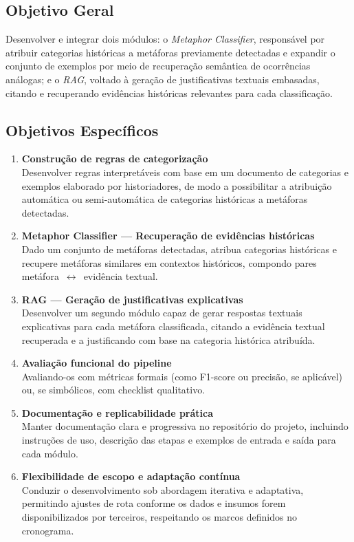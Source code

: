 \subsection{\texorpdfstring{\textbf{Objetivo
Geral}}{Objetivo Geral}}\label{objetivo-geral}

Desenvolver e integrar dois módulos: o \emph{Metaphor Classifier},
responsável por atribuir categorias históricas a metáforas previamente
detectadas e expandir o conjunto de exemplos por meio de recuperação
semântica de ocorrências análogas; e o \emph{RAG}, voltado à geração de
justificativas textuais embasadas, citando e recuperando evidências 
históricas relevantes para cada classificação.

\subsection{\texorpdfstring{\textbf{Objetivos
Específicos}}{Objetivos Específicos}}\label{objetivos-especuxedficos}

\begin{enumerate}
\def\labelenumi{\arabic{enumi}.}
\item
  \textbf{Construção de regras de categorização}\\
  Desenvolver regras interpretáveis com base em um documento de
  categorias e exemplos elaborado por historiadores, de modo a
  possibilitar a atribuição automática ou semi-automática de categorias
  históricas a metáforas detectadas.
\item
  \textbf{Metaphor Classifier --- Recuperação de evidências
  históricas}\\
  Dado um conjunto de metáforas detectadas, atribua categorias
  históricas e recupere metáforas similares em contextos históricos,
  compondo pares metáfora~$\leftrightarrow$~evidência textual.
\item
  \textbf{RAG --- Geração de justificativas explicativas}\\
  Desenvolver um segundo módulo capaz de gerar respostas textuais
  explicativas para cada metáfora classificada, citando a evidência
  textual recuperada e a justificando com base na categoria histórica
  atribuída.
\item
  \textbf{Avaliação funcional do pipeline}\\
  Avaliando-os com métricas formais (como F1-score ou precisão, se
  aplicável) ou, se simbólicos, com checklist qualitativo.
\item
  \textbf{Documentação e replicabilidade prática}\\
  Manter documentação clara e progressiva no repositório do projeto,
  incluindo instruções de uso, descrição das etapas e exemplos de
  entrada e saída para cada módulo.
\item
  \textbf{Flexibilidade de escopo e adaptação contínua}\\
  Conduzir o desenvolvimento sob abordagem iterativa e adaptativa,
  permitindo ajustes de rota conforme os dados e insumos forem
  disponibilizados por terceiros, respeitando os marcos definidos no
  cronograma.
\end{enumerate}

